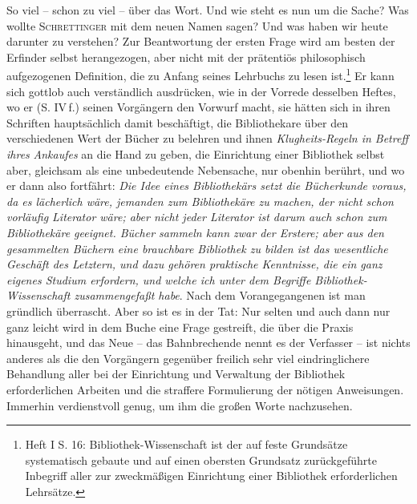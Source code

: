 \documentclass[a4paper,
fontsize=11pt,
oneside,
numbers=noperiodatend,
parskip=half-,
bibliography=totoc,
final
]{scrartcl}
\begin{document}
So viel -- schon zu viel -- über das Wort. Und wie steht es nun um die
Sache? Was wollte \textsc{Schrettinger} mit dem neuen Namen sagen? Und
was haben wir heute darunter zu verstehen? Zur Beantwortung der ersten
Frage wird am besten der Erfinder selbst herangezogen, aber nicht mit
der prätentiös philosophisch aufgezogenen Definition, die zu Anfang
seines Lehrbuchs zu lesen ist.\footnote{Heft I S. 16:
  Bibliothek-Wissenschaft ist der auf feste Grundsätze systematisch
  gebaute und auf einen obersten Grundsatz zurückgeführte Inbegriff
  aller zur zweckmäßigen Einrichtung einer Bibliothek erforderlichen
  Lehrsätze.} Er kann sich gottlob auch verständlich ausdrücken, wie in
der Vorrede desselben Heftes, wo er (S. IV\,f.) seinen Vorgängern den
Vorwurf macht, sie hätten sich in ihren Schriften hauptsächlich damit
beschäftigt, die Bibliothekare über den verschiedenen Wert der Bücher zu
belehren und ihnen \emph{Klugheits-Regeln in Betreff ihres}
\emph{Ankaufes} an die Hand zu geben, die Einrichtung einer Bibliothek
selbst aber, gleichsam als eine unbedeutende Nebensache, nur obenhin
berührt, und wo er dann also fortfährt: \emph{Die Idee eines
Bibliothekärs setzt die Bücherkunde voraus, da es lächerlich wäre,
jemanden zum Bibliothekäre zu machen, der nicht schon vorläufig
Literator wäre; aber nicht jeder Literator ist darum auch schon zum
Bibliothekäre geeignet. Bücher sammeln kann zwar der Erstere; aber aus
den gesammelten Büchern eine brauchbare Bibliothek zu bilden ist das
wesentliche Geschäft des Letztern, und dazu gehören praktische
Kenntnisse, die ein ganz eigenes Studium erfordern, und welche ich unter
dem Begriffe Bibliothek-Wissenschaft zusammengefaßt habe}. Nach dem
Vorangegangenen ist man gründlich überrascht. Aber so ist es in der Tat:
Nur selten und auch dann nur ganz leicht wird in dem Buche eine Frage
gestreift, die über die Praxis hinausgeht, und das Neue -- das
Bahnbrechende nennt es der Verfasser -- ist nichts anderes als die den
Vorgängern gegenüber freilich sehr viel eindringlichere Behandlung aller
bei der Einrichtung und Verwaltung der Bibliothek erforderlichen
Arbeiten und die straffere Formulierung der nötigen Anweisungen.
Immerhin verdienstvoll genug, um ihm die großen Worte nachzusehen.
\end{document}
